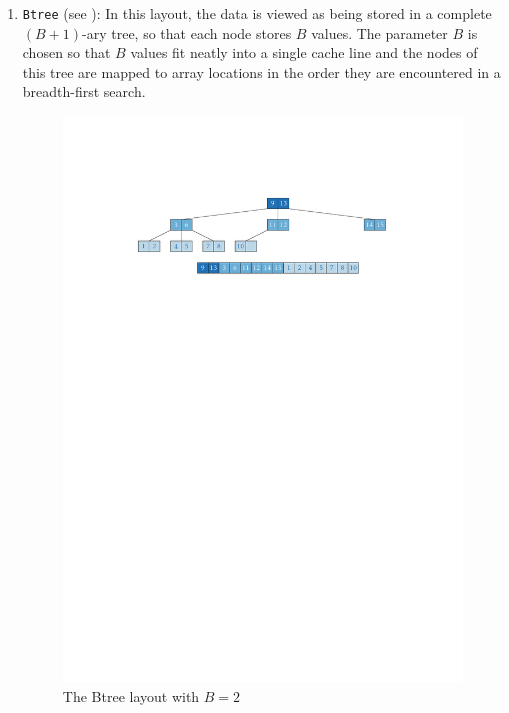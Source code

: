\documentclass{patmorin}
\begin{document}
\begin{enumerate}

  \item \texttt{Btree} (see ): In this layout, the data
  is viewed as being stored in a complete $(B+1)$-ary tree, so that
  each node stores $B$ values.  The parameter $B$ is chosen so that $B$
  values fit neatly into a single cache line and the nodes of this tree
  are mapped to array locations in the order they are encountered in a
  breadth-first search.

  \begin{figure}
    \begin{center}\includegraphics{btree}\end{center}
    \caption{The Btree layout with $B=2$}
  \end{figure}


\end{enumerate}
\end{document}
